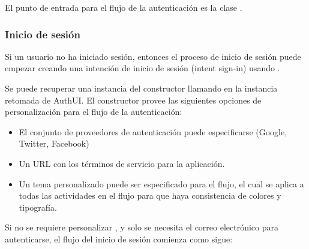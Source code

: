 El punto de entrada para el flujo de la autenticación es la clase
.


\subsubsection{Inicio de sesión}
\label{\detokenize{dev_docs:inicio-de-sesion}}
Si un usuario no ha iniciado sesión, entonces el proceso de inicio de sesión
puede empezar creando una intención de inicio de sesión (intent sign-in) usando .


Se puede recuperar una instancia del constructor llamando
 en la instancia retomada de AuthUI.
El constructor provee las siguientes opciones de personalización para el flujo
de la autenticación:
\begin{itemize}
\item {} 
El conjunto de proveedores de autenticación puede especificarse (Google, Twitter, Facebook)

\item {} 
Un URL con los términos de servicio para la aplicación.

\item {} 
Un tema personalizado puede ser especificado para el flujo, el cual se aplica a todas las actividades en el flujo para que haya consistencia de colores y tipografía.

\end{itemize}

Si no se requiere personalizar , y solo se necesita el correo electrónico para
autenticarse, el flujo del inicio de sesión comienza como sigue:

%
\begin{sphinxVerbatim}[commandchars=\\\{\}]
      


\end{sphinxVerbatim}

